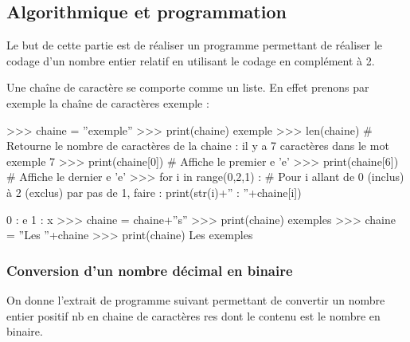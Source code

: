 \documentclass[10pt]{article}
\begin{document}
\setcounter{subparagraph}{6}
%



\subsection{Algorithmique et programmation}

Le but de cette partie est de réaliser un programme permettant de réaliser le codage d'un nombre entier relatif en utilisant le codage en complément à 2. 

\begin{py}
Une chaîne de caractère se comporte comme un liste. En effet prenons par exemple la chaîne de caractères \textsf{exemple} :

\begin{minipage}[c]{.95\linewidth}
\begin{python}
>>> chaine = ''exemple''
>>> print(chaine)
        exemple
>>> len(chaine)  # Retourne le nombre de caractères de la chaine : il y a 7 caractères dans le mot exemple
        7
>>> print(chaine[0]) # Affiche le premier e
        'e'
>>> print(chaine[6]) # Affiche le dernier e
        'e'
>>> for i in range(0,2,1) : # Pour i allant de 0 (inclus) à 2 (exclus) par pas de 1, faire : 
            print(str(i)+'' : ''+chaine[i])
            
        0 : e
        1 : x
>>> chaine = chaine+''s''
>>> print(chaine)
        exemples
>>> chaine = ''Les ''+chaine
>>> print(chaine)
        Les exemples
\end{python}
\end{minipage}
\end{py}

\subsubsection{Conversion d'un nombre décimal en binaire}
On donne l'extrait de programme suivant permettant de convertir un nombre entier positif \textsf{nb} en chaine de caractères \textsf{res} dont le contenu est le nombre en binaire. 
\end{document}
